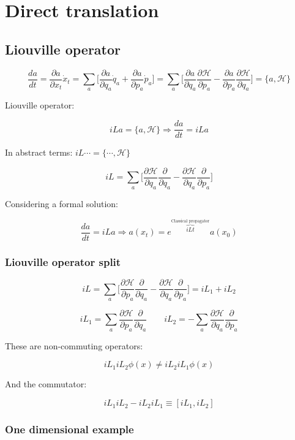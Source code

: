 \chapter{Direct translation}

\section{Liouville operator}

$$\frac{da}{dt} = \frac{\partial a}{\partial x_t}\dot{x}_t = \sum\limits_a\biggl[\frac{\partial a}{\partial q_a}\dot{q}_a + \frac{\partial a}{\partial p_a}\dot{p}_a\biggr] = \sum\limits_a\biggl[\frac{\partial a}{\partial q_a}\frac{\partial\mathcal{H}}{\partial p_a} - \frac{\partial a}{\partial p_a}\frac{\partial\mathcal{H}}{\partial q_a}\biggr] = \{a, \mathcal{H}\}$$

Liouville operator:

$$iLa = \{a, \mathcal{H}\}\Rightarrow\frac{da}{dt} = iLa$$

In abstract terms: $iL\cdots = \{\cdots, \mathcal{H}\}$

$$iL = \sum\limits_a\biggl[\frac{\partial\mathcal{H}}{\partial q_a}\frac{\partial}{\partial q_a} - \frac{\partial\mathcal{H}}{\partial q_a}\frac{\partial}{\partial p_a}\biggr]$$

Considering a formal solution:

$$\frac{da}{dt} = iLa\Rightarrow a(x_t) = e^{\overbrace{iLt}^{\text{Classical propagator}}}a(x_0)$$

	\subsection{Liouville operator split}

	$$iL = \sum\limits_a\biggl[\frac{\partial\mathcal{H}}{\partial p_a}\frac{\partial}{\partial q_a} - \frac{\partial\mathcal{H}}{\partial q_a}\frac{\partial}{\partial p_a}\biggr] = iL_1 + iL_2$$

	$$iL_1 = \sum\limits_a\frac{\partial\mathcal{H}}{\partial p_a}\frac{\partial}{\partial q_a} \qquad iL_2 = -\sum\limits_a\frac{\partial\mathcal{H}}{\partial q_a}\frac{\partial}{\partial p_a}$$

	These are non-commuting operators:

	$$iL_1iL_2\phi(x)\neq iL_2iL_1\phi(x)$$

	And the commutator:

	$$iL_1iL_2-iL_2iL_1\equiv [iL_1, iL_2]$$


	\subsection{One dimensional example}

